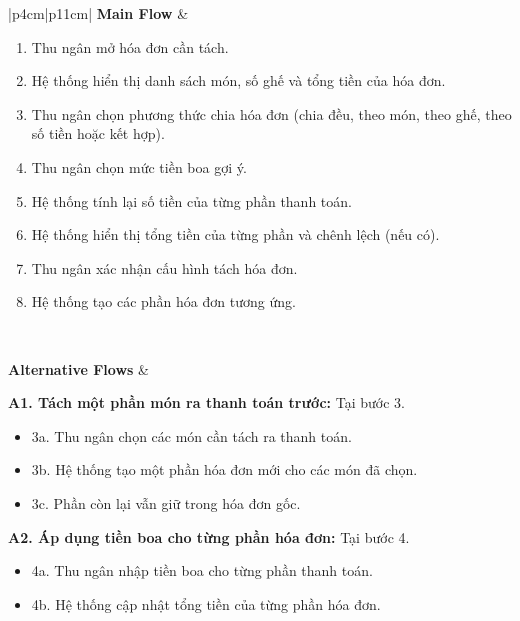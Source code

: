 \begin{longtable}{|p{4cm}|p{11cm}|}
\textbf{Main Flow} &
\begin{minipage}[t]{\linewidth}
\vspace{0.3mm}
\begin{enumerate}
\item Thu ngân mở hóa đơn cần tách.
\item Hệ thống hiển thị danh sách món, số ghế và tổng tiền của hóa đơn.
\item Thu ngân chọn phương thức chia hóa đơn (chia đều, theo món, theo ghế, theo số tiền hoặc kết hợp).
\item Thu ngân chọn mức tiền boa gợi ý.
\item Hệ thống tính lại số tiền của từng phần thanh toán.
\item Hệ thống hiển thị tổng tiền của từng phần và chênh lệch (nếu có).
\item Thu ngân xác nhận cấu hình tách hóa đơn.
\item Hệ thống tạo các phần hóa đơn tương ứng.
\end{enumerate}
\vspace{0.3mm}
\end{minipage}
\\ \hline

\textbf{Alternative Flows} &
\begin{minipage}[t]{\linewidth}
\vspace{0.3mm}

\textbf{A1. Tách một phần món ra thanh toán trước:} Tại bước 3.

\begin{itemize}
\item 3a. Thu ngân chọn các món cần tách ra thanh toán.
\item 3b. Hệ thống tạo một phần hóa đơn mới cho các món đã chọn.
\item 3c. Phần còn lại vẫn giữ trong hóa đơn gốc.
\end{itemize}

\textbf{A2. Áp dụng tiền boa cho từng phần hóa đơn:} Tại bước 4.

\begin{itemize}
\item 4a. Thu ngân nhập tiền boa cho từng phần thanh toán.
\item 4b. Hệ thống cập nhật tổng tiền của từng phần hóa đơn.
\end{itemize}

\vspace{0.3mm}
\end{minipage}
\\ \hline


\end{longtable}
